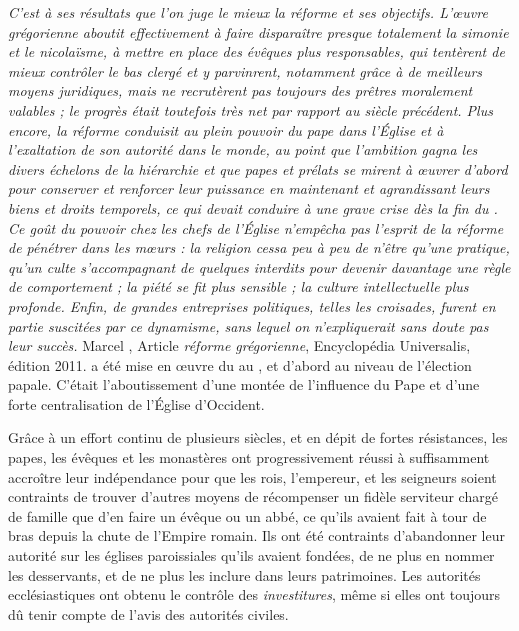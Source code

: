 {\emph{C'est à ses résultats que l'on juge le mieux la réforme et ses objectifs. L'œuvre grégorienne aboutit effectivement à faire disparaître presque totalement la simonie et le nicolaïsme, à mettre en place des évêques plus responsables, qui tentèrent de mieux contrôler le bas clergé et y parvinrent, notamment grâce à de meilleurs moyens juridiques, mais ne recrutèrent pas toujours des prêtres moralement valables ; le progrès était toutefois très net par rapport au siècle précédent. Plus encore, la réforme conduisit au plein pouvoir du pape dans l'Église et à l'exaltation de son autorité dans le monde, au point que l'ambition gagna les divers échelons de la hiérarchie et que papes et prélats se mirent à œuvrer d'abord pour conserver et renforcer leur puissance en maintenant et agrandissant leurs biens et droits temporels, ce qui devait conduire à une grave crise dès la fin du . Ce goût du pouvoir chez les chefs de l'Église n'empêcha pas l'esprit de la réforme de pénétrer dans les mœurs : la religion cessa peu à peu de n'être qu'une pratique, qu'un culte s'accompagnant de quelques interdits pour devenir davantage une règle de comportement ; la piété se fit plus sensible ; la culture intellectuelle plus profonde. Enfin, de grandes entreprises politiques, telles les croisades, furent en partie suscitées par ce dynamisme, sans lequel on n'expliquerait sans doute pas leur succès.}
Marcel , Article \emph{réforme grégorienne}, Encyclopédia Universalis, édition 2011.} 
a été mise en œuvre du  au , et d'abord au niveau de l'élection papale. C'était l'aboutissement d'une montée de l'influence du Pape et d'une forte centralisation de l'Église d'Occident. 

 Grâce à un effort continu de plusieurs siècles, et en dépit de fortes résistances, les papes, les évêques et les monastères ont progressivement réussi à suffisamment accroître leur indépendance pour que les rois, l'empereur, et les seigneurs soient contraints de trouver d'autres moyens de récompenser un fidèle serviteur chargé de famille que d'en faire un évêque ou un abbé, ce qu'ils avaient fait à tour de bras depuis la chute de l'Empire romain. Ils ont été contraints d'abandonner leur autorité sur les églises paroissiales qu'ils avaient fondées, de ne plus en nommer les desservants, et de ne plus les inclure dans leurs patrimoines. Les autorités ecclésiastiques ont obtenu le contrôle des \emph{investitures}, même si elles ont toujours dû tenir compte de l'avis des autorités civiles. 

